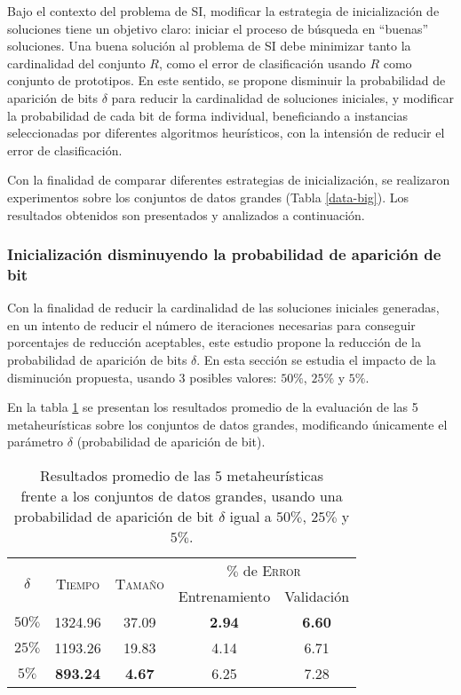 Bajo el contexto del problema de SI, modificar la estrategia de inicialización de soluciones tiene un objetivo claro: iniciar el proceso de búsqueda en ``buenas'' soluciones. Una buena solución al problema de SI debe minimizar tanto la cardinalidad del conjunto $R$, como el error de clasificación usando $R$ como conjunto de prototipos. En este sentido, se propone disminuir la probabilidad de aparición de bits $\delta$ para reducir la cardinalidad de soluciones iniciales, y modificar la probabilidad de cada bit de forma individual, beneficiando a instancias seleccionadas por diferentes algoritmos heurísticos, con la intensión de reducir el error de clasificación.

Con la finalidad de comparar diferentes estrategias de inicialización, se realizaron experimentos sobre los conjuntos de datos grandes (Tabla \ref{data-big}). Los resultados obtenidos son presentados y analizados a continuación.

\subsubsection{Inicialización disminuyendo la probabilidad de aparición de bit}

Con la finalidad de reducir la cardinalidad de las soluciones iniciales generadas, en un intento de reducir el número de iteraciones necesarias para conseguir porcentajes de reducción aceptables, este estudio propone la reducción de la probabilidad de aparición de bits $\delta$. En esta sección se estudia el impacto de la disminución propuesta, usando 3 posibles valores: $50\%$, $25\%$ y $5\%$.

En la tabla \ref{table-unif} se presentan los resultados promedio de la evaluación de las 5 metaheurísticas sobre los conjuntos de datos grandes, modificando únicamente el parámetro $\delta$ (probabilidad de aparición de bit).

\begin{table}[h!]
\centering
\begin{tabular}{c c c c c}
\hline
\multirow{2}{*}{$\delta$}
	& \multirow{2}{*}{\textsc{Tiempo}}
	& \multirow{2}{*}{\textsc{Tamaño}}
	& \multicolumn{2}{c}{$\%$ de \textsc{Error}} \\\cline{4-5}
 & & & \scriptsize{Entrenamiento} & \scriptsize{Validación} \\
\hline
\hline
$50\%$ & 1324.96 & 37.09 & \textbf{2.94} & \textbf{6.60} \\
$25\%$ & 1193.26 & 19.83 & 4.14 & 6.71 \\
$5\%$  & \textbf{893.24} & \textbf{4.67} & 6.25 & 7.28 \\
\hline
\end{tabular}
\caption[Resultados al disminuir la probabilidad de aparición de bit $\delta$]{Resultados promedio de las 5 metaheurísticas\\frente a los conjuntos de datos grandes, usando una\\probabilidad de aparición de bit $\delta$ igual a $50\%$, $25\%$ y $5\%$.}
\label{table-unif}
\end{table}

